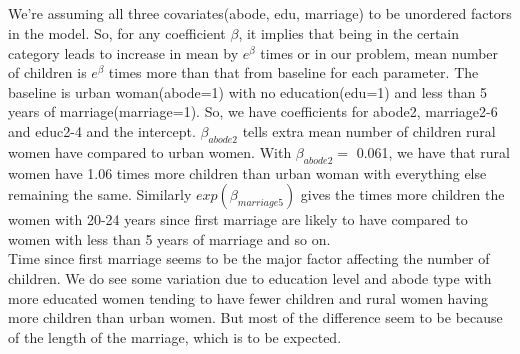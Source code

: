 \documentclass{article}
\begin{document}
\subsection{}
We're assuming all three covariates(abode, edu, marriage) to be unordered factors in the model. So, for any coefficient $\beta$, it implies that being in the certain category leads to increase in mean by $e^{\beta}$ times or in our problem, mean number of children is $e^{\beta}$ times more than that from baseline for each parameter. The baseline is urban woman(abode=1) with no education(edu=1) and less than 5 years of marriage(marriage=1). So, we have coefficients for abode2, marriage2-6 and educ2-4 and the intercept. $\beta_{abode2}$ tells extra mean number of children rural women have compared to urban women. With $\beta_{abode2}=$ 0.061, we have that rural women have 1.06 times more children than urban woman with everything else remaining the same. Similarly $exp(\beta_{marriage5})$ gives the times more children the women with 20-24 years since first marriage are likely to have compared to women with less than 5 years of marriage and so on.\\
Time since first marriage seems to be the major factor affecting the number of children. We do see some variation due to education level and abode type with more educated women tending to have fewer children and rural women having more children than urban women. But most of the difference seem to be because of the length of the marriage, which is to be expected.
\end{document}
